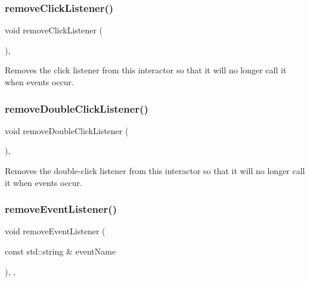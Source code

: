 \subsubsection{\texorpdfstring{remove\+Click\+Listener()}{removeClickListener()}}
{\footnotesize\ttfamily void remove\+Click\+Listener (\begin{DoxyParamCaption}{ }\end{DoxyParamCaption})\hspace{0.3cm}{\ttfamily [virtual]}, {\ttfamily [inherited]}}



Removes the click listener from this interactor so that it will no longer call it when events occur. 

\mbox{\label{classsgl_1_1GInteractor_aa4250907e4cdd77349c04f0cf5cdd3d3}} 
\subsubsection{\texorpdfstring{remove\+Double\+Click\+Listener()}{removeDoubleClickListener()}}
{\footnotesize\ttfamily void remove\+Double\+Click\+Listener (\begin{DoxyParamCaption}{ }\end{DoxyParamCaption})\hspace{0.3cm}{\ttfamily [virtual]}, {\ttfamily [inherited]}}



Removes the double-\/click listener from this interactor so that it will no longer call it when events occur. 

\mbox{\label{classsgl_1_1GObservable_acbcf1ed3a851ad8a3c17ef38d86b481d}} 
\subsubsection{\texorpdfstring{remove\+Event\+Listener()}{removeEventListener()}}
{\footnotesize\ttfamily void remove\+Event\+Listener (\begin{DoxyParamCaption}\item[{const std\+::string \&}]{event\+Name }\end{DoxyParamCaption})\hspace{0.3cm}{\ttfamily [protected]}, {\ttfamily [virtual]}, {\ttfamily [inherited]}}




